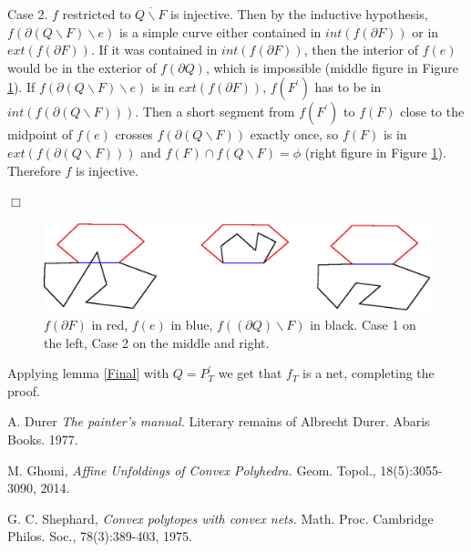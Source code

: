 \documentclass[openright, 12pt]{article}
\begin{document}
Case 2. $f$ restricted to $\overline{ Q \backslash F }$ is injective. Then by the inductive hypothesis, $f(\partial (Q \backslash F) \backslash e)$ is a simple curve either contained in $int(f( \partial F)) $ or in $ext( f (\partial F))$. If it was contained in $int(f( \partial F)) $, then the interior of $f(e)$ would be in the exterior of $f(\partial Q)$, which is impossible (middle figure in Figure \ref{Inj}). If $f(\partial (Q \backslash F) \backslash e)$ is in $ext( f (\partial F))$, $f(F^{\prime})$ has to be in $int (f(\partial (Q \backslash F)))$. Then a short segment from $f(F^{\prime})$ to $f(F)$ close to the midpoint of $f(e)$ crosses $f(\partial (Q \backslash F))$ exactly once, so $f(F)$ is in $ext (f(\partial (Q \backslash F)))$ and $f(F) \cap f(Q \backslash F) = \phi$ (right figure in Figure \ref{Inj}). Therefore $f$ is injective.



\hfill $\Box$


\begin{figure}[h]
\centering
\includegraphics[scale=0.8]{Injective.eps}
\caption{$f(\partial F) $ in red, $f(e)$ in blue, $f((\partial Q )\backslash F)$ in black. Case 1 on the left, Case 2 on the middle and right.}\label{Inj}
\end{figure}

Applying lemma \ref{Final} with $Q=P^{\prime}_T$ we get that $f_T$ is a net, completing the proof.


\begin{thebibliography}{9}

 A. Durer \textit{The painter's manual.} Literary remains of Albrecht Durer. Abaris Books. 1977.

 M. Ghomi, \textit{Affine Unfoldings of Convex Polyhedra.} Geom. Topol., 18(5):3055-3090, 2014. 
  

G. C. Shephard, \textit{Convex polytopes with convex nets.} Math. Proc. Cambridge Philos. Soc., 78(3):389-403, 1975. 
  
  
\end{thebibliography}
\end{document}
